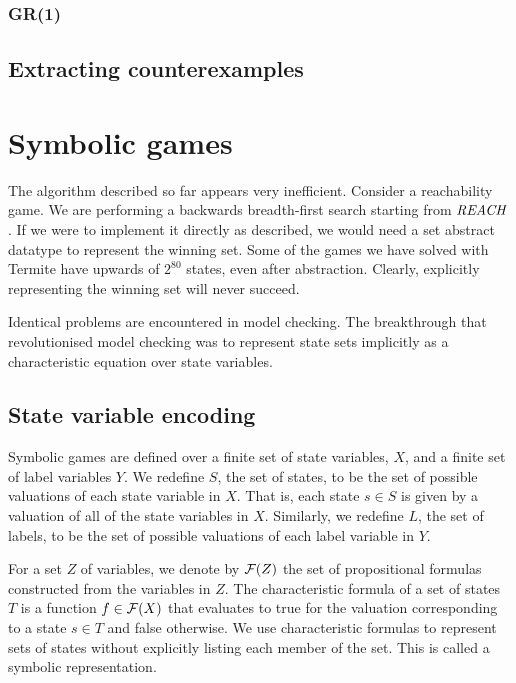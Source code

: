 \subsubsection{GR(1)}

\subsection{Extracting counterexamples}

\section{Symbolic games}

The algorithm described so far appears very inefficient. Consider a reachability game. We are performing a backwards breadth-first search starting from $\mathit{REACH}$. If we were to implement it directly as described, we would need a set abstract datatype to represent the winning set. Some of the games we have solved with Termite have upwards of $2^{80}$ states, even after abstraction. Clearly, explicitly representing the winning set will never succeed. 

Identical problems are encountered in model checking. The breakthrough that revolutionised model checking was to represent state sets implicitly as a characteristic equation over state variables.

\subsection{State variable encoding}

Symbolic games are defined over a finite set of state variables, $X$, and a finite set of label variables $Y$. We redefine $S$, the set of states, to be the set of possible valuations of each state variable in $X$. That is, each state $s \in S$ is given by a valuation of all of the state variables in $X$. Similarly, we redefine $L$, the set of labels, to be the set of possible valuations of each label variable in $Y$.

For a set $Z$ of variables, we denote by $\mathcal{F}(Z)$ the set of propositional formulas constructed from the variables in $Z$. The characteristic formula of a set of states $T$ is a function $f \in \mathcal{F}(X)$ that evaluates to true for the valuation corresponding to a state $s \in T$ and false otherwise. We use characteristic formulas to represent sets of states without explicitly listing each member of the set. This is called a symbolic representation.

